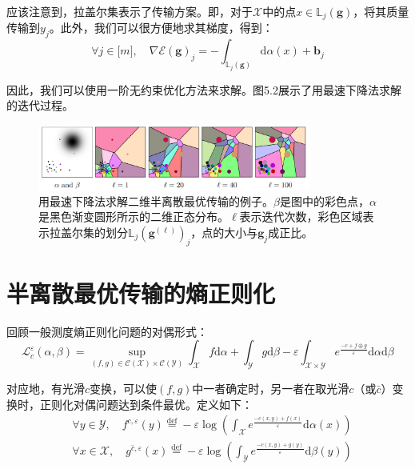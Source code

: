 \documentclass[cn,10pt,math=newtx,citestyle=gb7714-2015,bibstyle=gb7714-2015]{elegantbook}
\begin{document}
应该注意到，拉盖尔集表示了传输方案。即，对于$\mathcal{X}$中的点$x\in \mathbb{L}_j(\mathbf{g})$，将其质量传输到$y_j$。此外，我们可以很方便地求其梯度，得到：
\begin{equation}
    \forall j\in \mathbb{[}m\mathbb{]}, \quad \nabla \mathcal{E}(\mathbf{g})_j = -\int_{\mathbb{L}_j(\mathbf{g})} \text{d} \alpha(x) + \mathbf{b}_j
\end{equation}

因此，我们可以使用一阶无约束优化方法来求解。图5.2展示了用最速下降法求解的迭代过程。

\begin{figure}[H]
    \centering
    \includegraphics[width=0.8\textwidth]{figure/fig5.2.png}
    \caption{用最速下降法求解二维半离散最优传输的例子。$\beta$是图中的彩色点，$\alpha$是黑色渐变圆形所示的二维正态分布。$\ell$表示迭代次数，彩色区域表示拉盖尔集的划分$\mathbb{L}_j(\mathbf{g}^{(\ell)})_j$，点的大小与$\mathbf{g}_j$成正比。}
    \label{图5.2}
\end{figure}

\section{半离散最优传输的熵正则化}

回顾一般测度熵正则化问题的对偶形式：
\begin{equation}
    \mathcal{L}_c^\varepsilon (\alpha,\beta) = \sup_{(f,g)\in \mathcal{C(X)}\times \mathcal{C(Y)}} \int_\mathcal{X}f\text{d}\alpha + \int_\mathcal{Y} g\text{d}\beta - \varepsilon \int_{\mathcal{X}\times \mathcal{Y}} e^{\frac{-c+f\oplus g}{\varepsilon}} \text{d}\alpha \text{d}\beta
\end{equation}

对应地，有光滑$c$变换，可以使$(f,g)$中一者确定时，另一者在取光滑$c$（或$\bar c$）变换时，正则化对偶问题达到条件最优。定义如下：
\begin{align}
    & \forall y\in\mathcal{Y}, \quad f^{c,\varepsilon}(y)\overset{\text{def}}{=}-\varepsilon \log\left(\int_\mathcal{X} e^{\frac{-c(x,y)+f(x)}{\varepsilon}}\text{d}\alpha(x)\right) \\
    & \forall x\in\mathcal{X}, \quad g^{\bar c,\varepsilon}(x)\overset{\text{def}}{=}-\varepsilon \log\left(\int_\mathcal{Y} e^{\frac{-c(x,y)+g(y)}{\varepsilon}}\text{d}\beta(y)\right)
\end{align}
\end{document}
